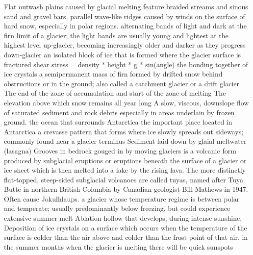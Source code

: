  Flat outwash plains caused by glacial melting feature braided streams and sinous sand and gravel bars.
 parallel wave-like ridges caused by winds on the surface of hard snow, especially in polar regions.
 alternating bands of light and dark at the firn limit of a glacier; the light bands are usually young and lightest at the highest level up-glacier, becoming increasingly older and darker as they progress down-glacier
 an isolated block of ice that is formed where the glacier surface is fractured
 shear stress = density * height * g * sin(angle)
 the bonding together of ice crystals
 a semipermanent mass of firn formed by drifted snow behind obstructions or in the ground; also called a catchment glacier or a drift glacier
 The end of the zone of accumulation and start of the zone of melting
 The elevation above which snow remains all year long
 A slow, viscous, downslope flow of saturated sediment and rock debris especially in areas underlain by frozen ground.
 the ocean that surrounds Antarctica
 the important place located in Antarctica
 a crevasse pattern that forms where ice slowly spreads out sideways; commonly found near a glacier terminus
 Sediment laid down by glaial meltwater (lasagna)
 Grooves in bedrock gouged in by moving glaciers
 is a volcanic form produced by subglacial eruptions or eruptions beneath the surface of a glacier or ice sheet which is then melted into a lake by the rising lava. The more distinctly flat-topped, steep-sided subglacial volcanoes are called tuyas, named after Tuya Butte in northern British Columbia by Canadian geologist Bill Mathews in 1947. Often cause Jokulhlaups.
 a glacier whose temperature regime is between polar and temperate; usually predominantly below freezing, but could experience extensive summer melt
 Ablation hollow that develops, during intense sunshine.
 Deposition of ice crystals on a surface which occurs when the temperature of the surface is colder than the air above and colder than the frost point of that air.
 in the summer months when the glacier is melting there will be quick sunspots

